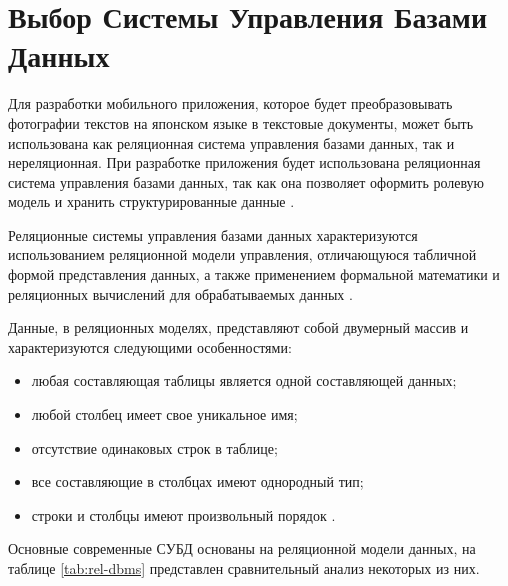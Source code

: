 \section{Выбор Системы Управления Базами Данных}

Для разработки мобильного приложения, которое будет преобразовывать
фотографии текстов на японском языке в текстовые документы,
может быть использована как реляционная система управления
базами данных, так и нереляционная. При разработке приложения
будет использована реляционная система управления базами данных,
так как она позволяет оформить ролевую модель и хранить структурированные
данные \cite{nosql}.

Реляционные системы управления базами данных характеризуются
использованием реляционной модели управления, отличающуюся
табличной формой представления данных, а также применением
формальной математики и реляционных вычислений для обрабатываемых
данных \cite{bdbms}.

Данные, в реляционных моделях, представляют собой двумерный
массив и характеризуются следующими особенностями:

\begin{itemize}[label={$-$}]
  \item любая составляющая таблицы является одной
составляющей данных;
  \item любой столбец имеет свое уникальное имя;
  \item отсутствие одинаковых строк в таблице;
  \item все составляющие в столбцах имеют однородный тип;
  \item строки и столбцы имеют произвольный порядок \cite{relational-dbms}.
\end{itemize}

Основные современные СУБД основаны на реляционной модели данных,
на таблице \ref{tab:rel-dbms} представлен сравнительный анализ
некоторых из них.

\clearpage

